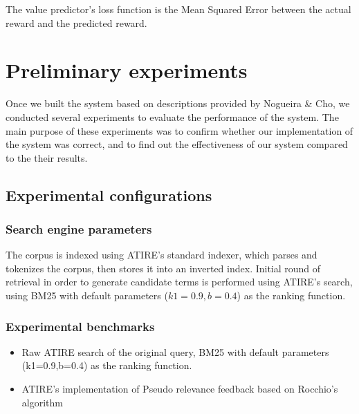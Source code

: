 The value predictor’s loss function is the Mean Squared Error between the actual reward and the predicted reward.


%



\section{Preliminary experiments}
Once we built the system based on descriptions provided by Nogueira \& Cho, we conducted several experiments to evaluate the performance of the system. The main purpose of these experiments was to confirm whether our implementation of the system was correct, and to find out the effectiveness of our system compared to the their results. 



\subsection{Experimental configurations}

\subsubsection{Search engine parameters}

The corpus is indexed using ATIRE's standard indexer, which parses and tokenizes the corpus, then stores it into an inverted index. Initial round of retrieval in order to generate candidate terms is performed using ATIRE’s search, using BM25 with default parameters ($k1=0.9,b=0.4$) as the ranking function. 


\subsubsection{Experimental benchmarks}

\begin{itemize}
	\item Raw ATIRE search of the original query, BM25 with default parameters (k1=0.9,b=0.4) as the ranking function. 
	
	\item ATIRE's implementation of Pseudo relevance feedback based on Rocchio's algorithm
\end{itemize}



